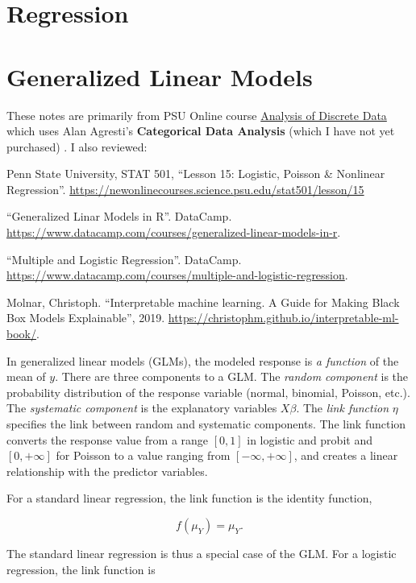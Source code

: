 \documentclass[
]{book}
\begin{document}
\hypertarget{regression}{%
\chapter{Regression}\label{regression}}

\hypertarget{generalized-linear-models}{%
\chapter{Generalized Linear Models}\label{generalized-linear-models}}

These notes are primarily from PSU Online course \href{https://online.stat.psu.edu/stat504}{Analysis of Discrete Data} which uses Alan Agresti's \textbf{Categorical Data Analysis} (which I have not yet purchased) \citep{Agresti2013}. I also reviewed:

Penn State University, STAT 501, ``Lesson 15: Logistic, Poisson \& Nonlinear Regression''. \url{https://newonlinecourses.science.psu.edu/stat501/lesson/15}

``Generalized Linar Models in R''. DataCamp. \url{https://www.datacamp.com/courses/generalized-linear-models-in-r}.

``Multiple and Logistic Regression''. DataCamp. \url{https://www.datacamp.com/courses/multiple-and-logistic-regression}.

Molnar, Christoph. ``Interpretable machine learning. A Guide for Making Black Box Models Explainable'', 2019. \url{https://christophm.github.io/interpretable-ml-book/}.

In generalized linear models (GLMs), the modeled response is \emph{a function} of the mean of \(y\). There are three components to a GLM. The \emph{random component} is the probability distribution of the response variable (normal, binomial, Poisson, etc.). The \emph{systematic component} is the explanatory variables \(X\beta\). The \emph{link function} \(\eta\) specifies the link between random and systematic components. The link function converts the response value from a range \([0,1]\) in logistic and probit and \([0,+\infty]\) for Poisson to a value ranging from \([-\infty, +\infty]\), and creates a linear relationship with the predictor variables.

For a standard linear regression, the link function is the identity function,

\[f(\mu_Y) = \mu_Y.\]

The standard linear regression is thus a special case of the GLM. For a logistic regression, the link function is
\end{document}
